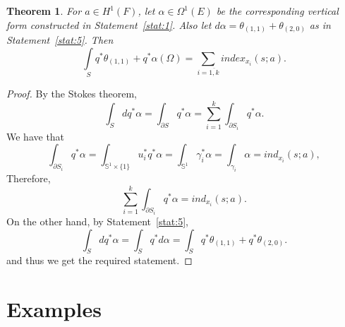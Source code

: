 \documentclass[12pt,letterpaper]{amsart}
\theoremstyle{definition}
\theoremstyle{plain}
\newtheorem{thm}{Theorem}
\theoremstyle{remark}
\begin{document}
\begin{thm}
For $a \in H^1(F)$, let $\alpha \in \Omega^1(E)$ be the corresponding vertical form constructed in Statement~\ref{stat:1}.
Also let $d\alpha = \theta_{(1, 1)} + \theta_{(2, 0)}$ as in Statement~\ref{stat:5}.
Then
\begin{equation}
\int\limits_S q^*\theta_{(1, 1)} + q^*\alpha(\Omega) = \sum\limits_{i = \overline{1, k}} index_{x_i}(s; a).
\label{eq:33}
\end{equation}
\label{thm:2}
\end{thm}
\begin{proof}
By the Stokes theorem,
\begin{equation}
\int_S d q^* \alpha = \int_{\partial S} q^*\alpha = \sum\limits_{i=1}^k \int_{\partial S_i} q^*\alpha.
\label{eq:34}
\end{equation}
We have that
\begin{equation}
\int_{\partial S_i} q^*\alpha = \int_{\mathbb{S}^1 \times \{ 1 \}} u_i^* q^* \alpha = \int_{\mathbb{S}^1} \gamma_i^* \alpha = \int_{\gamma_i} \alpha = ind_{x_i}(s; a),
\label{eq:35}
\end{equation}
Therefore,
\begin{equation}
\sum\limits_{i=1}^k \int_{\partial S_i} q^*\alpha = ind_{x_i}(s; a).
\label{eq:36}
\end{equation}
On the other hand, by Statement~\ref{stat:5},
\begin{equation}
\int_S d q^* \alpha = \int_S q^* d\alpha = \int_S q^*\theta_{(1, 1)} + q^*\theta_{(2, 0)}.
\label{eq:37}
\end{equation}
and thus we get the required statement.
\end{proof}



\section{Examples}
\label{sec:4}
\end{document}
